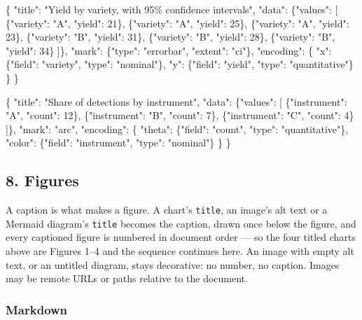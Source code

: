 \documentclass[
]{article}
\newenvironment{Shaded}{}{}
\newcommand{\NormalTok}[1]{#1}
\begin{document}
\begin{Shaded}
\begin{Highlighting}[]
\NormalTok{\{}
\NormalTok{  "title": "Yield by variety, with 95\% confidence intervals",}
\NormalTok{  "data": \{"values": [}
\NormalTok{    \{"variety": "A", "yield": 21\}, \{"variety": "A", "yield": 25\},}
\NormalTok{    \{"variety": "A", "yield": 23\}, \{"variety": "B", "yield": 31\},}
\NormalTok{    \{"variety": "B", "yield": 28\}, \{"variety": "B", "yield": 34\}}
\NormalTok{  ]\},}
\NormalTok{  "mark": \{"type": "errorbar", "extent": "ci"\},}
\NormalTok{  "encoding": \{}
\NormalTok{    "x": \{"field": "variety", "type": "nominal"\},}
\NormalTok{    "y": \{"field": "yield", "type": "quantitative"\}}
\NormalTok{  \}}
\NormalTok{\}}
\end{Highlighting}
\end{Shaded}

\begin{Shaded}
\begin{Highlighting}[]
\NormalTok{\{}
\NormalTok{  "title": "Share of detections by instrument",}
\NormalTok{  "data": \{"values": [}
\NormalTok{    \{"instrument": "A", "count": 12\}, \{"instrument": "B", "count": 7\},}
\NormalTok{    \{"instrument": "C", "count": 4\}}
\NormalTok{  ]\},}
\NormalTok{  "mark": "arc",}
\NormalTok{  "encoding": \{}
\NormalTok{    "theta": \{"field": "count", "type": "quantitative"\},}
\NormalTok{    "color": \{"field": "instrument", "type": "nominal"\}}
\NormalTok{  \}}
\NormalTok{\}}
\end{Highlighting}
\end{Shaded}

\subsection{8. Figures}\label{figures}

A caption is what makes a figure. A chart's \texttt{title}, an image's
alt text or a Mermaid diagram's \texttt{title} becomes the caption,
drawn once below the figure, and every captioned figure is numbered in
document order --- so the four titled charts above are Figures 1--4 and
the sequence continues here. An image with empty alt text, or an
untitled diagram, stays decorative: no number, no caption. Images may be
remote URLs or paths relative to the document.

\subsubsection{Markdown}\label{markdown-8}
\end{document}
